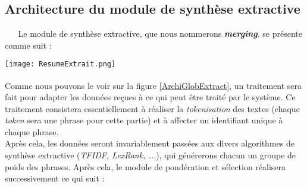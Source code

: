 \subsection{Architecture du module de synthèse extractive}\label{SectionMerging}
$ _{} $ $ _{} $ $ _{} $ $ _{} $ $ _{} $Le module de synthèse extractive, que nous nommerons \textit{\textbf{merging}}, se présente comme suit :\newpage
$ _{ } $\\
\begin{center}
\texttt{[image: ResumeExtrait.png]}
\label{ArchiGlobExtract}
\end{center}
$ _{ } $\\
Comme nous pouvons le voir sur la figure \ref{ArchiGlobExtract}, un traitement sera fait pour adapter les données reçues à ce qui peut être traité par le système. Ce traitement consistera es\-sen\-tiel\-le\-ment à réaliser la \textit{tokenisation} des textes (chaque \textit{token} sera une phrase pour cette partie) et à affecter un identifiant unique à chaque phrase.\\
Après cela, les données seront invariablement passées aux divers algorithmes de synthèse ex\-tra\-ctive (\textit{TFIDF, LexRank, ...}), qui générerons chacun un groupe de poids des phrases. Après cela, le module de pon\-dé\-ra\-tion et sélection réalisera successivement ce qui suit :
